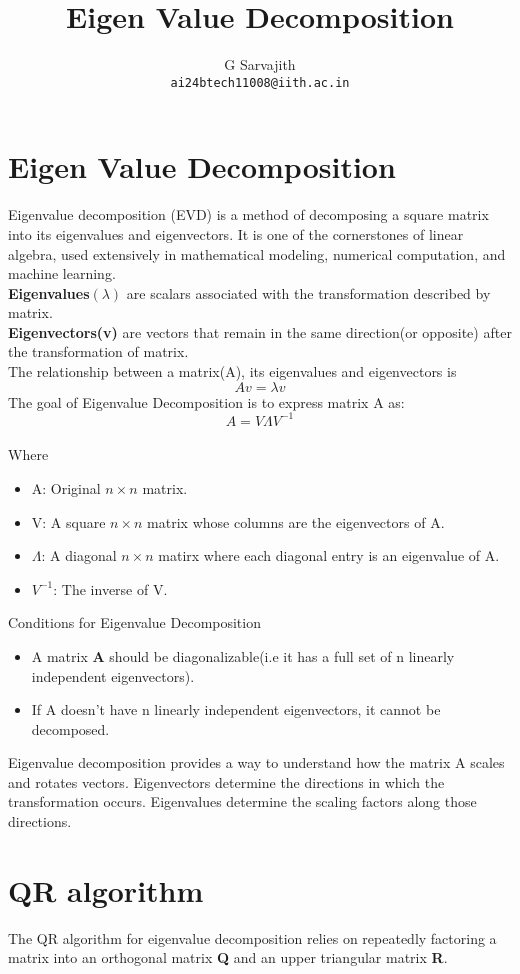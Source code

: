 \documentclass{article}
\title{Eigen Value Decomposition}
\author{%
G Sarvajith\\
\texttt{ai24btech11008@iith.ac.in}\\
}
\begin{document}
\maketitle
\section{Eigen Value Decomposition}
Eigenvalue decomposition (EVD) is a method of decomposing a square matrix into its eigenvalues and eigenvectors. It is one of the cornerstones of linear algebra, used extensively in mathematical modeling, numerical computation, and machine learning.\\
\textbf{Eigenvalues}$(\lambda)$ are scalars associated with the transformation described by matrix.\\
\textbf{Eigenvectors(v)} are vectors that remain in the same direction(or opposite) after the transformation of matrix.\\
The relationship between a matrix(A), its eigenvalues and eigenvectors is$$Av=\lambda v$$
The goal of Eigenvalue Decomposition is to express matrix A as:$$A =V\Lambda V^{-1}$$\\ 
Where
\begin{itemize}
 \item A: Original $n\times n$ matrix.
 \item V: A square $n\times n$ matrix whose columns are the eigenvectors of A.
 \item $\Lambda$: A diagonal $n\times n$ matirx where each diagonal entry is an eigenvalue of A. 
 \item $V^{-1}$: The inverse of V.
\end{itemize}
Conditions for Eigenvalue Decomposition\\
\begin{itemize}
    \item A matrix \textbf{A} should be diagonalizable(i.e it has a full set of n linearly independent eigenvectors).
    \item If A doesn't have n linearly independent eigenvectors, it cannot be decomposed.
\end{itemize}
Eigenvalue decomposition provides a way to understand how the matrix A scales and rotates vectors. Eigenvectors determine the directions in which the transformation occurs.
Eigenvalues determine the scaling factors along those directions.\\
\section{QR algorithm }
The QR algorithm for eigenvalue decomposition relies on repeatedly factoring a matrix into an orthogonal matrix \textbf{Q} and an upper triangular matrix \textbf{R}.
\end{document}
